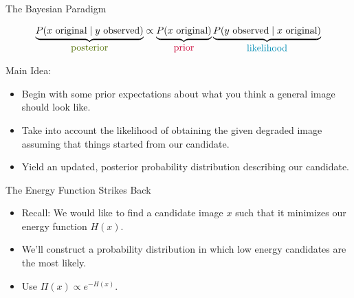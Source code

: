 \documentclass[10pt]{beamer}
\begin{document}
\begin{frame}{The Bayesian Paradigm}

\[ \underbrace{P(x \text{ original} \mid y \text{ observed})}_{{\color{posterior}\text{\normalsize{posterior}}}} \propto \underbrace{P(x \text{ original})}_{{\color{prior}\text{\normalsize{prior}}}} \underbrace{P(y \text{ observed} \mid x \text{ original})}_{{\color{likelihood}\text{\normalsize{likelihood}}}} \]

\begin{block}{Main Idea:}
\begin{itemize}
\item Begin with some {\color{prior}prior} expectations about what you think a general image should look like.
\item Take into account the {\color{likelihood}likelihood} of obtaining the given degraded image assuming that things started from our candidate.
\item Yield an updated, {\color{posterior}posterior} probability distribution describing our candidate.
\end{itemize}
\end{block}
\end{frame}

\begin{frame}{The Energy Function Strikes Back}
\begin{itemize}
\item Recall: We would like to find a candidate image $x$ such that it minimizes our energy function $H(x)$.
\item We'll construct a probability distribution in which low energy candidates are the most likely.
\item Use $\Pi(x) \propto e^{-H(x)}$.
\end{itemize}
\end{frame}
\end{document}
